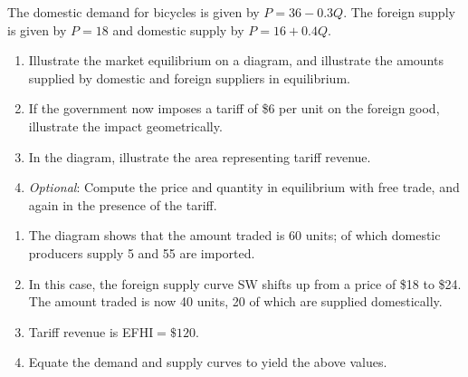 \begin{enumialphparenastyle}
\begin{econex}\label{ex:ch15ex3}
The domestic demand for bicycles is given by $P=36-0.3Q$. The foreign supply is given by $P=18$ and domestic supply by $P=16+0.4Q$.
\begin{enumerate}
\item  Illustrate the market equilibrium on a diagram, and illustrate the amounts supplied by domestic and foreign suppliers in equilibrium.
\item  If the government now imposes a tariff of \$6 per unit on the foreign good, illustrate the impact geometrically.
\item  In the diagram, illustrate the area representing tariff revenue.
\item  \textit{Optional}: Compute the price and quantity in equilibrium with free trade, and again in the presence of the tariff.
\end{enumerate}
\begin{econsolution}
\begin{enumerate}
\item	The diagram shows that the amount traded is 60 units; of which domestic producers supply 5 and 55 are imported.
\item	In this case, the foreign supply curve SW shifts up from a price of \$18 to \$24. The amount traded is now 40 units, 20 of which are supplied domestically.
\item	Tariff revenue is EFHI$=\$120$.
\item	Equate the demand and supply curves to yield the above values.
\end{enumerate}
\begin{center*}
\end{center*}
\end{econsolution}
\end{econex}
\end{enumialphparenastyle}
